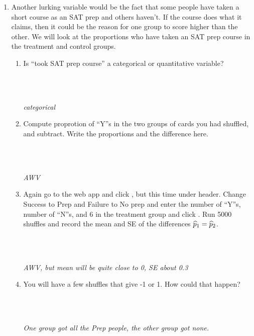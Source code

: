 \begin{enumerate}
\item Another lurking variable would be the fact that some people have
  taken a short course as an SAT prep and others haven't.  If the
  course does what it claims, then it could be the reason for one
  group to score higher than the other. We will look at the
  proportions who have taken an SAT prep course in the treatment and
  control groups.  
  \begin{enumerate}
  \item Is ``took SAT prep course'' a categorical or quantitative
    variable? 
\begin{students}
        \vspace{1cm}\\
\end{students}
\begin{key}
  \\ {\it categorical}
\end{key}

    \item Compute proprotion of ``Y''s in the two groups of cards you
      had shuffled, and subtract.  Write the proportions and the
      difference here.
\begin{students}
        \vspace{1cm}\\
\end{students}
\begin{key}
  \\ {\it  AWV}
\end{key}

    \item Again go to the  web app and click , but
      this time under  header.  Change {\sf Success}
      to {\sf Prep} and {\sf Failure} to {\sf No prep} and enter the
      number of ``Y''s, number of ``N''s, and 6 in the treatment group
      and click .  Run 5000 shuffles and record the mean and
      SE of the differences $\widehat{p}_1 = \widehat{p}_2$.
\begin{students}
        \vspace{1cm}\\
\end{students}
\begin{key}
  \\ {\it AWV, but mean will be quite close to 0, SE about 0.3}
\end{key}
    \item You will have a few shuffles that give -1 or 1.  How could
      that happen? 
\begin{students}
        \vspace{1cm}\\
\end{students}
\begin{key}
  \\ {\it  One group got all the Prep people, the other group got none.}
\end{key}
 

\end{enumerate}
\end{enumerate}

